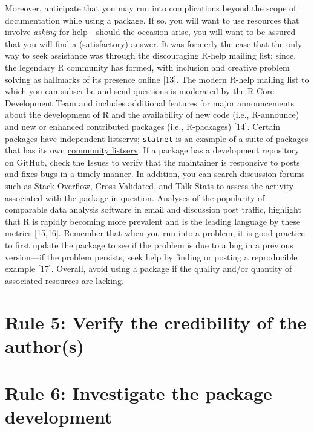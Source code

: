 \documentclass[10pt,letterpaper]{article}
\begin{document}
Moreover, anticipate that you may run into complications beyond the
scope of documentation while using a package. If so, you will want to
use resources that involve \emph{asking} for help---should the occasion
arise, you will want to be assured that you will find a (satisfactory)
answer. It was formerly the case that the only way to seek assistance
was through the discouraging R-help mailing list; since, the legendary R
community has formed, with inclusion and creative problem solving as
hallmarks of its presence online {[}13{]}. The modern R-help mailing
list to which you can subscribe and send questions is moderated by the R
Core Development Team and includes additional features for major
announcements about the development of R and the availability of new
code (i.e., R-announce) and new or enhanced contributed packages (i.e.,
R-packages) {[}14{]}. Certain packages have independent listservs;
\texttt{statnet} is an example of a suite of packages that has its own
\href{http://statnet.org/}{community listserv}. If a package has a
development repository on GitHub, check the Issues to verify that the
maintainer is responsive to posts and fixes bugs in a timely manner. In
addition, you can search discussion forums such as Stack Overflow, Cross
Validated, and Talk Stats to assess the activity associated with the
package in question. Analyses of the popularity of comparable data
analysis software in email and discussion post traffic, highlight that R
is rapidly becoming more prevalent and is the leading language by these
metrics {[}15,16{]}. Remember that when you run into a problem, it is
good practice to first update the package to see if the problem is due
to a bug in a previous version---if the problem persists, seek help by
finding or posting a reproducible example {[}17{]}. Overall, avoid using
a package if the quality and/or quantity of associated resources are
lacking.

\hypertarget{rule-5-verify-the-credibility-of-the-authors}{%
\section{Rule 5: Verify the credibility of the
author(s)}\label{rule-5-verify-the-credibility-of-the-authors}}

\hypertarget{rule-6-investigate-the-package-development}{%
\section{Rule 6: Investigate the package
development}\label{rule-6-investigate-the-package-development}}
\end{document}
